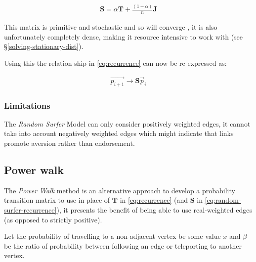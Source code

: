 \documentclass[11pt]{report}
\begin{document}
\begin{align}
\mathbf{S} = \alpha \mathbf{T} + \frac{(1- \alpha)}{n} \mathbf{J} \label{eq:random-surfer}
\end{align}

This matrix is primitive and stochastic and so will converge
\cite[]{langvilleGooglePageRankScience2012}, it is also
unfortunately completely dense, making it resource intensive to work with (see
\S \ref{solving-stationary-dist}).

Using this the relation ship in \eqref{eq:recurrence} can now be re
expressed as:

\begin{align}
\vec{p_{i+1}} \rightarrow \mathbf{S} \vec{p}_{i} \label{eq:random-surfer-recurrence}
\end{align}






\subsubsection{Limitations}
\label{sec:org725b0b3}
The \emph{Random Surfer} Model can only consider positively weighted edges, it cannot
take into account negatively weighted edges which might indicate that
links promote aversion rather than endorsement.



\subsection{Power walk}
\label{pwalk}



The \emph{Power Walk} method is an alternative approach to develop a probability
transition matrix to use in place of \(\mathbf{T}\) in \eqref{eq:recurrence} (and \(\mathbf{S}\) in \eqref{eq:random-surfer-recurrence}), it presents the benefit of being able to use real-weighted edges (as opposed to strictly positive).

Let the probability of travelling to a non-adjacent vertex be some value \(x\)
and \(\beta\) be the ratio of probability between following an edge or
teleporting to another vertex.
\end{document}
